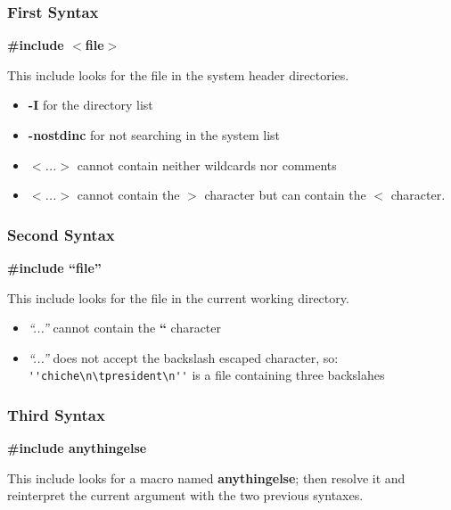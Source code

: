 {%

\begin{frame}[containsverbatim]
  \frametitle{First Syntax}

  \textbf{\#include $<$file$>$}

  \nl

  This include looks for the file in the system header directories.

  \begin{itemize}
  \item
    \textbf{-I} for the directory list
  \item
    \textbf{-nostdinc} for not searching in the system list
  \item
    \textit{$<$...$>$} cannot contain neither wildcards nor comments
  \item
    \textit{$<$...$>$} cannot contain the \textbf{$>$} character but
    can contain the \textbf{$<$} character.
  \end{itemize}
\end{frame}


\begin{frame}[containsverbatim]
  \frametitle{Second Syntax}

  \textbf{\#include ``file''}

  \nl

  This include looks for the file in the current working directory.

  \begin{itemize}
  \item
    \textit{``...''} cannot contain the \textbf{``} character
  \item
    \textit{``...''} does not accept the backslash escaped character,
    so: \verb|''chiche\n\tpresident\n''| is a file containing
    three backslahes
  \end{itemize}
\end{frame}


\begin{frame}[containsverbatim]
  \frametitle{Third Syntax}

  \textbf{\#include anythingelse}

  \nl

  This include looks for a macro named \textbf{anythingelse}; then resolve
  it and reinterpret the current argument with the two previous syntaxes.
\end{frame}


}
